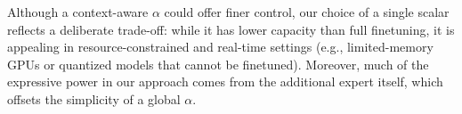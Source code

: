 \documentclass[11pt]{article}
\begin{document}
\begin{table}[!htb]
  \centering
  \caption{Compression performance comparison between fixed and dynamic weight approaches.}
  \label{tab:multi_experts_compression_results}
\end{table}


Although a context-aware $\alpha$ could offer finer control, our choice of a single scalar reflects a deliberate trade-off: while it has lower capacity than full finetuning, it is appealing in resource-constrained and real-time settings (e.g., limited-memory GPUs or quantized models that cannot be finetuned). Moreover, much of the expressive power in our approach comes from the additional expert itself, which offsets the simplicity of a global $\alpha$.
\end{document}
